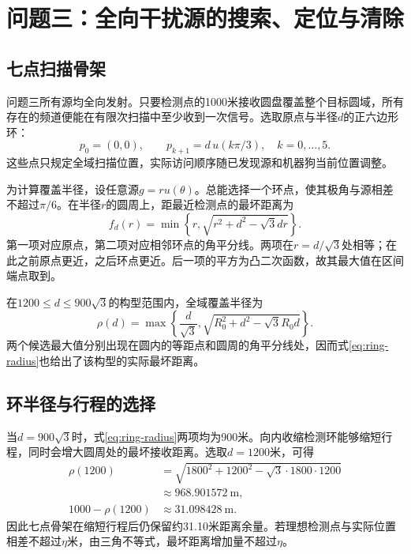 \documentclass[UTF8,fontset=fandol,a4paper,zihao=-4]{ctexart}
\begin{document}
\section{问题三：全向干扰源的搜索、定位与清除}
\subsection{七点扫描骨架}
问题三所有源均全向发射。只要检测点的1000米接收圆盘覆盖整个目标圆域，所有存在的频道便能在有限次扫描中至少收到一次信号。选取原点与半径$d$的正六边形环：
\begin{equation}\label{eq:ring-points}
p_0=(0,0),\qquad p_{k+1}=d\,u(k\pi/3),\quad k=0,\ldots,5.
\end{equation}
这些点只规定全域扫描位置，实际访问顺序随已发现源和机器狗当前位置调整。

为计算覆盖半径，设任意源$g=r u(\theta)$。总能选择一个环点，使其极角与源相差不超过$\pi/6$。在半径$r$的圆周上，距最近检测点的最坏距离为
\begin{equation}\label{eq:ring-envelope}
f_d(r)=\min\left\{r,\sqrt{r^2+d^2-\sqrt3dr}\right\}.
\end{equation}
第一项对应原点，第二项对应相邻环点的角平分线。两项在$r=d/\sqrt3$处相等；在此之前原点更近，之后环点更近。后一项的平方为凸二次函数，故其最大值在区间端点取到。

在$1200\le d\le900\sqrt3$的构型范围内，全域覆盖半径为
\begin{equation}\label{eq:ring-radius}
\rho(d)=\max\left\{\frac d{\sqrt3},
\sqrt{R_0^2+d^2-\sqrt3R_0d}\right\}.
\end{equation}
两个候选最大值分别出现在圆内的等距点和圆周的角平分线处，因而式\eqref{eq:ring-radius}也给出了该构型的实际最坏距离。

\subsection{环半径与行程的选择}
当$d=900\sqrt3$时，式\eqref{eq:ring-radius}两项均为900米。向内收缩检测环能够缩短行程，同时会增大圆周处的最坏接收距离。选取$d=1200$米，可得
\begin{equation}\label{eq:ring-margin}
\begin{aligned}
\rho(1200)&=\sqrt{1800^2+1200^2-\sqrt3\cdot1800\cdot1200}\\
&\approx968.901572\ \mathrm m,\\
1000-\rho(1200)&\approx31.098428\ \mathrm m.
\end{aligned}
\end{equation}
因此七点骨架在缩短行程后仍保留约31.10米距离余量。若理想检测点与实际位置相差不超过$\eta$米，由三角不等式，最坏距离增加量不超过$\eta$。
\end{document}
